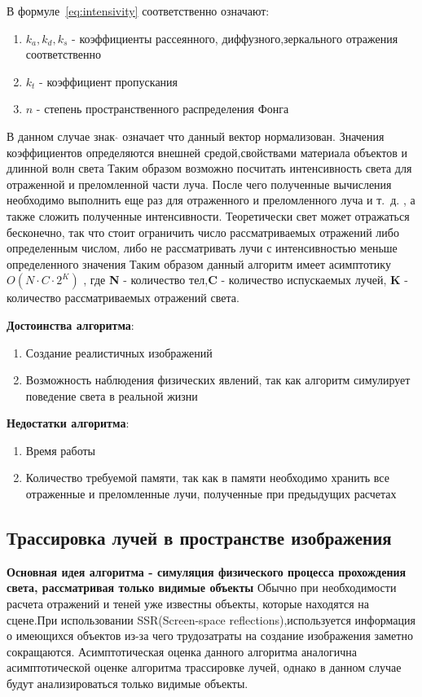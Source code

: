 \documentclass[a4paper,14pt,unknownkeysallowed]{extreport}
\begin{document}
В формуле~\ref{eq:intensivity} соответственно означают:
\begin{enumerate}
	\item $k_a,k_d,k_s$ - коэффициенты рассеянного, диффузного,зеркального отражения соответственно
	\item $k_t$ - коэффициент пропускания
	\item $n$ - степень пространственного распределения Фонга
\end{enumerate}
В данном случае знак $ \hat{} $  означает что данный вектор нормализован.
Значения коэффициентов определяются внешней средой,свойствами материала объектов и длинной волн света
Таким образом возможно посчитать интенсивность света для отраженной и преломленной части луча.
После чего полученные вычисления необходимо выполнить еще раз для отраженного и преломленного луча и т.~д.
, а также сложить полученные интенсивности.
Теоретически свет может отражаться бесконечно, так что стоит ограничить число рассматриваемых отражений либо определенным числом,
либо не рассматривать лучи с интенсивностью меньше определенного значения
Таким образом данный алгоритм имеет асимптотику $O(N \cdot C \cdot 2^{K})$ , где \textbf{N} - количество тел,\textbf{C} - количество испускаемых лучей,
\textbf{K} - количество рассматриваемых отражений света. \cite{Rodgers}



\textbf{Достоинства алгоритма}:
\begin{enumerate}
	\item Создание реалистичных изображений \cite{Rodgers,modern_ray_tracing,SSR}
	\item Возможность наблюдения физических явлений, так как алгоритм симулирует поведение света в реальной жизни \cite{Rodgers,modern_ray_tracing,SSR}
\end{enumerate}


\textbf{Недостатки алгоритма}:
\begin{enumerate}
	\item Время работы \cite{Rodgers,modern_ray_tracing,SSR}
	\item Количество требуемой памяти, так как в памяти необходимо хранить все отраженные и преломленные лучи, полученные при предыдущих расчетах \cite{Rodgers,modern_ray_tracing,SSR}
\end{enumerate}


\subsection{Трассировка лучей в пространстве изображения}
\textbf{Основная идея алгоритма - симуляция физического процесса прохождения света, рассматривая только видимые объекты} \newline
Обычно при необходимости расчета отражений и теней уже известны объекты, которые находятся на сцене.При использовании SSR(Screen-space reflections),используется информация о имеющихся
объектов из-за чего трудозатраты на создание изображения заметно сокращаются.
Асимптотическая оценка данного алгоритма аналогична асимптотической оценке алгоритма трассировке лучей, однако в данном случае будут анализироваться только видимые объекты.\cite{SSR}
\end{document}
